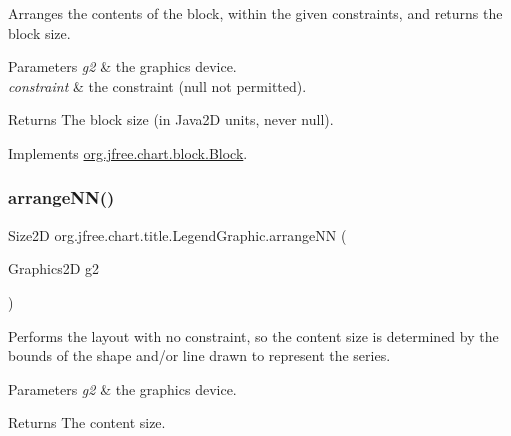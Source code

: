Arranges the contents of the block, within the given constraints, and returns the block size.


\begin{DoxyParams}{Parameters}
{\em g2} & the graphics device. \\
\hline
{\em constraint} & the constraint ({\ttfamily null} not permitted).\\
\hline
\end{DoxyParams}
\begin{DoxyReturn}{Returns}
The block size (in Java2D units, never {\ttfamily null}). 
\end{DoxyReturn}


Implements \mbox{\hyperlink{interfaceorg_1_1jfree_1_1chart_1_1block_1_1_block_ab4cabbc237c5277a4a0018bab930e5fe}{org.\+jfree.\+chart.\+block.\+Block}}.

\mbox{\label{classorg_1_1jfree_1_1chart_1_1title_1_1_legend_graphic_aaf2f310fd939d84c1887c86d1ec9ff4b}} 
\subsubsection{\texorpdfstring{arrange\+N\+N()}{arrangeNN()}}
{\footnotesize\ttfamily Size2D org.\+jfree.\+chart.\+title.\+Legend\+Graphic.\+arrange\+NN (\begin{DoxyParamCaption}\item[{Graphics2D}]{g2 }\end{DoxyParamCaption})\hspace{0.3cm}{\ttfamily [protected]}}

Performs the layout with no constraint, so the content size is determined by the bounds of the shape and/or line drawn to represent the series.


\begin{DoxyParams}{Parameters}
{\em g2} & the graphics device.\\
\hline
\end{DoxyParams}
\begin{DoxyReturn}{Returns}
The content size. 
\end{DoxyReturn}
\mbox{\label{classorg_1_1jfree_1_1chart_1_1title_1_1_legend_graphic_acd53c74488e430e30cbca1021131a9f4}} 
